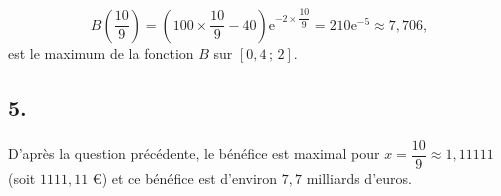 \documentclass[10pt]{article}
\providecommand{\e}{{\mathrm{e}}}
\begin{document}
\[
B\left(\dfrac{10}{9}\right) = (100 \times \dfrac{10}{9} - 40)\e^{-2 \times \dfrac{10}{9}} = 210\e^{-5} \approx 7{,}706,
\]
est le maximum de la fonction \(B\) sur \([0{,}4 \,;\, 2]\).

\subsection*{5.}

D'après la question précédente, le bénéfice est maximal pour \( x = \dfrac{10}{9} \approx 1{,}11111 \) (soit \(1111{,}11\) €) et ce bénéfice est d'environ \(7{,}7\) milliards d'euros.
\end{document}
